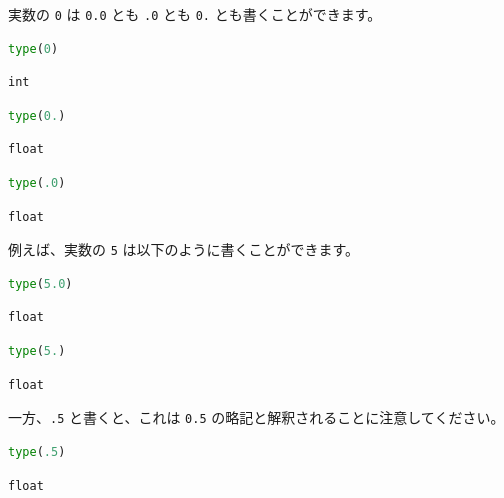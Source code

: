 実数の \texttt{0} は \texttt{0.0} とも \texttt{.0} とも \texttt{0.} とも書くことができます。


\begin{lstlisting}[style=codecell,language=Python]
type(0)
\end{lstlisting}

\begin{lstlisting}[style=outputcell]
int
\end{lstlisting}

\begin{lstlisting}[style=codecell,language=Python]
type(0.)
\end{lstlisting}

\begin{lstlisting}[style=outputcell]
float
\end{lstlisting}

\begin{lstlisting}[style=codecell,language=Python]
type(.0)
\end{lstlisting}

\begin{lstlisting}[style=outputcell]
float
\end{lstlisting}

例えば、実数の \texttt{5} は以下のように書くことができます。


\begin{lstlisting}[style=codecell,language=Python]
type(5.0)
\end{lstlisting}

\begin{lstlisting}[style=outputcell]
float
\end{lstlisting}

\begin{lstlisting}[style=codecell,language=Python]
type(5.)
\end{lstlisting}

\begin{lstlisting}[style=outputcell]
float
\end{lstlisting}

一方、\texttt{.5} と書くと、これは \texttt{0.5} の略記と解釈されることに注意してください。


\begin{lstlisting}[style=codecell,language=Python]
type(.5)
\end{lstlisting}

\begin{lstlisting}[style=outputcell]
float
\end{lstlisting}

